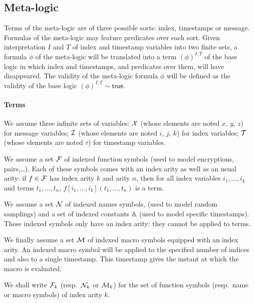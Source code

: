 \subsection{Meta-logic}

Terms of the meta-logic are of three possible sorts: index, timestamps
or message. Formulas of the meta-logic may feature predicates over each sort.
Given interpretation $I$ and $T$ of index and timestamp variables
into two finite sets, a formula $\phi$ of the meta-logic will be translated
into a term $(\phi)^{I,T}$ of the base logic in which index and timestamps,
and predicates over them, will have disappeared. The validity of the
meta-logic formula $\phi$ will be defined as the validity of the base logic
$(\phi)^{I,T}\sim\mathsf{true}$.

\paragraph{Terms}

We assume three infinite sets of variables:
$\mathcal{X}$ (whose elements are noted $x$, $y$, $z$) for message variables;
$\mathcal{I}$ (whose elements are noted $i$, $j$, $k$) for index variables;
$\mathcal{T}$ (whose elements are noted $\tau$) for timestamp variables.

We assume a set $\mathcal{F}$ of indexed function symbols
(used to model encryptions, pairs,\dots).
Each of these symbols comes with an index arity as well as an usual arity:
if $f\in\mathcal{F}$ has index arity $k$ and arity $n$,
then for all index variables $i_1,\ldots,i_k$ and terms $t_1,\ldots,t_n$,
$f[i_1,\ldots,i_k](t_1,\ldots,t_n)$ is a term.

We assume a set $\mathcal{N}$ of indexed names symbols,
(used to model random samplings)
and a set of indexed constants $\mathbb{A}$
(used to model specific timestamps).
These indexed symbols only have an index arity: they
cannot be applied to terms.

We finally assume a set $\mathcal{M}$ of indexed macro symbols
equipped with an index arity.
An indexed macro symbol will be applied to the specified number of
indices and also to a single timestamp.
This timestamp gives the instant at which the macro is evaluated.

We shall write $\mathcal{F}_k$ (resp.\ $\mathcal{N}_k$ or $\mathcal{M}_k$) for the set of function
symbols (resp.\ name or macro symbols) of index arity $k$.

